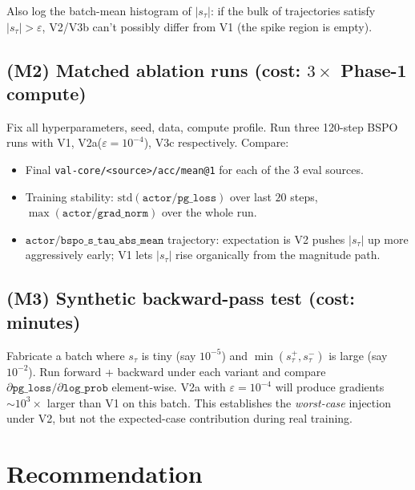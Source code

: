 \documentclass[11pt]{article}
\begin{document}
Also log the batch-mean histogram of $|s_\tau|$: if the bulk of
trajectories satisfy $|s_\tau| > \varepsilon$, V2/V3b can't possibly
differ from V1 (the spike region is empty).

\subsection*{(M2) Matched ablation runs (cost: $3\times$ Phase-1 compute)}

Fix all hyperparameters, seed, data, compute profile. Run three 120-step
BSPO runs with V1, V2a($\varepsilon=10^{-4}$), V3c respectively. Compare:
\begin{itemize}
\item Final \verb|val-core/<source>/acc/mean@1| for each of the 3
eval sources.
\item Training stability: $\mathrm{std}(\texttt{actor/pg\_loss})$ over
last $20$ steps, $\max(\texttt{actor/grad\_norm})$ over the whole run.
\item $\texttt{actor/bspo\_s\_tau\_abs\_mean}$ trajectory: expectation is
V2 pushes $|s_\tau|$ up more aggressively early; V1 lets $|s_\tau|$
rise organically from the magnitude path.
\end{itemize}

\subsection*{(M3) Synthetic backward-pass test (cost: minutes)}

Fabricate a batch where $s_\tau$ is tiny (say $10^{-5}$) and
$\min(s_\tau^+, s_\tau^-)$ is large (say $10^{-2}$). Run forward +
backward under each variant and compare $\partial\texttt{pg\_loss}/\partial\texttt{log\_prob}$
element-wise. V2a with $\varepsilon = 10^{-4}$ will produce gradients
$\sim 10^3\times$ larger than V1 on this batch. This establishes the
\emph{worst-case} injection under V2, but not the expected-case
contribution during real training.

\section{Recommendation}
\label{sec:reco}
\end{document}
